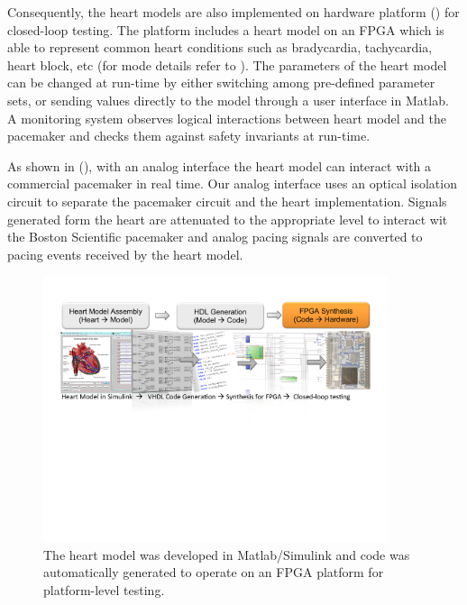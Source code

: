 Consequently, the heart models are also implemented on hardware platform () for closed-loop testing. The platform includes a heart model on an FPGA which is able to represent common heart conditions such as bradycardia, tachycardia, heart block, etc (for mode details refer to \cite{VHM_proc}). The parameters of the heart model can be changed at run-time by either switching among pre-defined parameter sets, or sending values directly to the model through a user interface in Matlab. A monitoring system observes logical interactions between heart model and the pacemaker and checks them against safety invariants at run-time. 

As shown in (), with an analog interface the heart model can interact with a commercial pacemaker in real time. Our analog interface uses an optical isolation circuit to separate the pacemaker circuit and the heart implementation. Signals generated form the heart are attenuated to the appropriate level to interact wit the Boston Scientific pacemaker and analog pacing signals are converted to pacing events received by the heart model. 
\begin{figure}[!t]
\center
		\includegraphics[width=0.9\textwidth]{figs/modeling_heart.pdf}
\caption{The heart model was developed in Matlab/Simulink and code was automatically generated to operate on an FPGA platform for platform-level testing.}
\label{fig:modeling_heart}
\end{figure}
